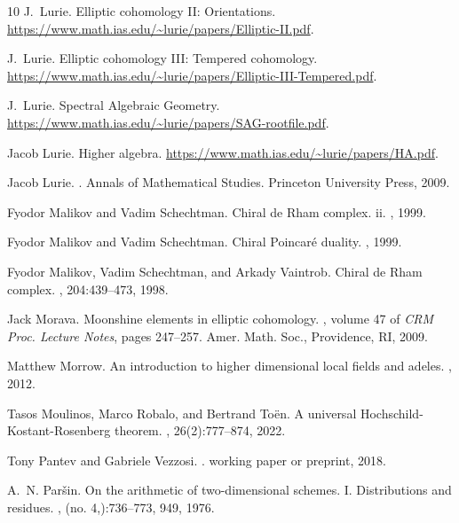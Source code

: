 \documentclass[11pt,letterpaper]{amsart}
\begin{document}
\begin{thebibliography}{10}
J.~Lurie.
\newblock Elliptic cohomology {II}: Orientations.
\newblock \url{https://www.math.ias.edu/~lurie/papers/Elliptic-II.pdf}.

J.~Lurie.
\newblock Elliptic cohomology {III}: Tempered cohomology.
\newblock
  \url{https://www.math.ias.edu/~lurie/papers/Elliptic-III-Tempered.pdf}.

J.~Lurie.
\newblock Spectral {A}lgebraic {G}eometry.
\newblock \url{https://www.math.ias.edu/~lurie/papers/SAG-rootfile.pdf}.

Jacob Lurie.
\newblock Higher algebra.
\newblock \url{https://www.math.ias.edu/~lurie/papers/HA.pdf}.

Jacob Lurie.
.
\newblock Annals of Mathematical Studies. Princeton University Press, 2009.

Fyodor Malikov and Vadim Schechtman.
\newblock Chiral de {R}ham complex. ii.
, 1999.

Fyodor Malikov and Vadim Schechtman.
\newblock Chiral {P}oincar\'e duality.
, 1999.

Fyodor Malikov, Vadim Schechtman, and Arkady Vaintrob.
\newblock Chiral de {R}ham complex.
, 204:439--473, 1998.

Jack Morava. 
\newblock Moonshine elements in elliptic cohomology. 
, volume 47
of {\em CRM Proc. Lecture Notes}, pages 247–257. Amer. Math. Soc., Providence, RI, 2009.

Matthew Morrow.
\newblock An introduction to higher dimensional local fields and adeles.
, 2012.

Tasos Moulinos, Marco Robalo, and Bertrand To\"{e}n.
\newblock A universal {H}ochschild-{K}ostant-{R}osenberg theorem.
, 26(2):777--874, 2022.

Tony Pantev and Gabriele Vezzosi.
.
\newblock working paper or preprint, 2018.

A.~N. Par\v{s}in.
\newblock On the arithmetic of two-dimensional schemes. {I}. {D}istributions
  and residues.
, (no. 4,):736--773, 949, 1976.


\end{thebibliography}
\end{document}
